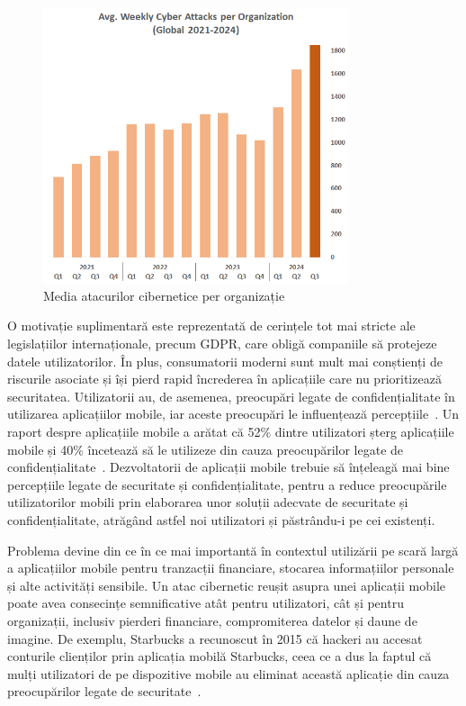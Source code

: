 \documentclass[runningheads]{llncs}
\begin{document}
\begin{figure}[ht]
  \centering
  \includegraphics[width=0.8\textwidth]{checkpointGraf.png}
  \caption{Media atacurilor cibernetice per organizație~\cite{checkpoint}}
  \label{fig:dataset-sample}
\end{figure}

O motivație suplimentară este reprezentată de cerințele tot mai stricte ale legislațiilor internaționale, precum GDPR, care obligă companiile să protejeze datele utilizatorilor. În plus, consumatorii moderni sunt mult mai conștienți de riscurile asociate și își pierd rapid încrederea în aplicațiile care nu prioritizează securitatea. Utilizatorii au, de asemenea, preocupări legate de confidențialitate în utilizarea aplicațiilor mobile, iar aceste preocupări le influențează percepțiile~\cite{SHAW201944}. Un raport despre aplicațiile mobile a arătat că 52\% dintre utilizatori șterg aplicațiile mobile și 40\% încetează să le utilizeze din cauza preocupărilor legate de confidențialitate~\cite{mef}. Dezvoltatorii de aplicații mobile trebuie să înțeleagă mai bine percepțiile legate de securitate și confidențialitate, pentru a reduce preocupările utilizatorilor mobili prin elaborarea unor soluții adecvate de securitate și confidențialitate, atrăgând astfel noi utilizatori și păstrându-i pe cei existenți.

Problema devine din ce în ce mai importantă în contextul utilizării pe scară largă a aplicațiilor mobile pentru tranzacții financiare, stocarea informațiilor personale și alte activități sensibile. Un atac cibernetic reușit asupra unei aplicații mobile poate avea consecințe semnificative atât pentru utilizatori, cât și pentru organizații, inclusiv pierderi financiare, compromiterea datelor și daune de imagine. De exemplu, Starbucks a recunoscut în 2015 că hackeri au accesat conturile clienților prin aplicația mobilă Starbucks, ceea ce a dus la faptul că mulți utilizatori de pe dispozitive mobile au eliminat această aplicație din cauza preocupărilor legate de securitate~\cite{starbucks}.
\end{document}
